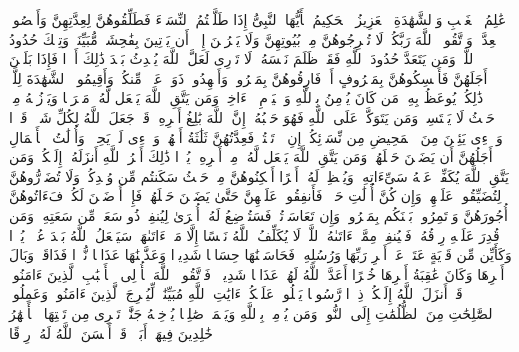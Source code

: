 \stopbuffer
\startbuffer[\q:64:18]
عَٰلِمُ ٱلۡغَیۡبِ وَٱلشَّهَٰدَةِ ٱلۡعَزِیزُ ٱلۡحَكِیمُ%
\stopbuffer
\startbuffer[\q:65:1]
یَٰۤأَیُّهَا ٱلنَّبِیُّ إِذَا طَلَّقۡتُمُ ٱلنِّسَاۤءَ فَطَلِّقُوهُنَّ لِعِدَّتِهِنَّ وَأَحۡصُوا۟ ٱلۡعِدَّةَۖ وَٱتَّقُوا۟ ٱللَّهَ رَبَّكُمۡۖ لَا تُخۡرِجُوهُنَّ مِنۢ بُیُوتِهِنَّ وَلَا یَخۡرُجۡنَ إِلَّاۤ أَن یَأۡتِینَ بِفَٰحِشَةࣲ مُّبَیِّنَةࣲۚ وَتِلۡكَ حُدُودُ ٱللَّهِۚ وَمَن یَتَعَدَّ حُدُودَ ٱللَّهِ فَقَدۡ ظَلَمَ نَفۡسَهُۥۚ لَا تَدۡرِی لَعَلَّ ٱللَّهَ یُحۡدِثُ بَعۡدَ ذَٰلِكَ أَمۡرࣰا%
\stopbuffer
\startbuffer[\q:65:2]
فَإِذَا بَلَغۡنَ أَجَلَهُنَّ فَأَمۡسِكُوهُنَّ بِمَعۡرُوفٍ أَوۡ فَارِقُوهُنَّ بِمَعۡرُوفࣲ وَأَشۡهِدُوا۟ ذَوَیۡ عَدۡلࣲ مِّنكُمۡ وَأَقِیمُوا۟ ٱلشَّهَٰدَةَ لِلَّهِۚ ذَٰلِكُمۡ یُوعَظُ بِهِۦ مَن كَانَ یُؤۡمِنُ بِٱللَّهِ وَٱلۡیَوۡمِ ٱلۡءَاخِرِۚ وَمَن یَتَّقِ ٱللَّهَ یَجۡعَل لَّهُۥ مَخۡرَجࣰا%
\stopbuffer
\startbuffer[\q:65:3]
وَیَرۡزُقۡهُ مِنۡ حَیۡثُ لَا یَحۡتَسِبُۚ وَمَن یَتَوَكَّلۡ عَلَى ٱللَّهِ فَهُوَ حَسۡبُهُۥۤۚ إِنَّ ٱللَّهَ بَٰلِغُ أَمۡرِهِۦۚ قَدۡ جَعَلَ ٱللَّهُ لِكُلِّ شَیۡءࣲ قَدۡرࣰا%
\stopbuffer
\startbuffer[\q:65:4]
وَٱلَّٰۤءِی یَئِسۡنَ مِنَ ٱلۡمَحِیضِ مِن نِّسَاۤئِكُمۡ إِنِ ٱرۡتَبۡتُمۡ فَعِدَّتُهُنَّ ثَلَٰثَةُ أَشۡهُرࣲ وَٱلَّٰۤءِی لَمۡ یَحِضۡنَۚ وَأُو۟لَٰتُ ٱلۡأَحۡمَالِ أَجَلُهُنَّ أَن یَضَعۡنَ حَمۡلَهُنَّۚ وَمَن یَتَّقِ ٱللَّهَ یَجۡعَل لَّهُۥ مِنۡ أَمۡرِهِۦ یُسۡرࣰا%
\stopbuffer
\startbuffer[\q:65:5]
ذَٰلِكَ أَمۡرُ ٱللَّهِ أَنزَلَهُۥۤ إِلَیۡكُمۡۚ وَمَن یَتَّقِ ٱللَّهَ یُكَفِّرۡ عَنۡهُ سَیِّءَاتِهِۦ وَیُعۡظِمۡ لَهُۥۤ أَجۡرًا%
\stopbuffer
\startbuffer[\q:65:6]
أَسۡكِنُوهُنَّ مِنۡ حَیۡثُ سَكَنتُم مِّن وُجۡدِكُمۡ وَلَا تُضَاۤرُّوهُنَّ لِتُضَیِّقُوا۟ عَلَیۡهِنَّۚ وَإِن كُنَّ أُو۟لَٰتِ حَمۡلࣲ فَأَنفِقُوا۟ عَلَیۡهِنَّ حَتَّىٰ یَضَعۡنَ حَمۡلَهُنَّۚ فَإِنۡ أَرۡضَعۡنَ لَكُمۡ فَءَاتُوهُنَّ أُجُورَهُنَّ وَأۡتَمِرُوا۟ بَیۡنَكُم بِمَعۡرُوفࣲۖ وَإِن تَعَاسَرۡتُمۡ فَسَتُرۡضِعُ لَهُۥۤ أُخۡرَىٰ%
\stopbuffer
\startbuffer[\q:65:7]
لِیُنفِقۡ ذُو سَعَةࣲ مِّن سَعَتِهِۦۖ وَمَن قُدِرَ عَلَیۡهِ رِزۡقُهُۥ فَلۡیُنفِقۡ مِمَّاۤ ءَاتَىٰهُ ٱللَّهُۚ لَا یُكَلِّفُ ٱللَّهُ نَفۡسًا إِلَّا مَاۤ ءَاتَىٰهَاۚ سَیَجۡعَلُ ٱللَّهُ بَعۡدَ عُسۡرࣲ یُسۡرࣰا%
\stopbuffer
\startbuffer[\q:65:8]
وَكَأَیِّن مِّن قَرۡیَةٍ عَتَتۡ عَنۡ أَمۡرِ رَبِّهَا وَرُسُلِهِۦ فَحَاسَبۡنَٰهَا حِسَابࣰا شَدِیدࣰا وَعَذَّبۡنَٰهَا عَذَابࣰا نُّكۡرࣰا%
\stopbuffer
\startbuffer[\q:65:9]
فَذَاقَتۡ وَبَالَ أَمۡرِهَا وَكَانَ عَٰقِبَةُ أَمۡرِهَا خُسۡرًا%
\stopbuffer
\startbuffer[\q:65:10]
أَعَدَّ ٱللَّهُ لَهُمۡ عَذَابࣰا شَدِیدࣰاۖ فَٱتَّقُوا۟ ٱللَّهَ یَٰۤأُو۟لِی ٱلۡأَلۡبَٰبِ ٱلَّذِینَ ءَامَنُوا۟ۚ قَدۡ أَنزَلَ ٱللَّهُ إِلَیۡكُمۡ ذِكۡرࣰا%
\stopbuffer
\startbuffer[\q:65:11]
رَّسُولࣰا یَتۡلُوا۟ عَلَیۡكُمۡ ءَایَٰتِ ٱللَّهِ مُبَیِّنَٰتࣲ لِّیُخۡرِجَ ٱلَّذِینَ ءَامَنُوا۟ وَعَمِلُوا۟ ٱلصَّٰلِحَٰتِ مِنَ ٱلظُّلُمَٰتِ إِلَى ٱلنُّورِۚ وَمَن یُؤۡمِنۢ بِٱللَّهِ وَیَعۡمَلۡ صَٰلِحࣰا یُدۡخِلۡهُ جَنَّٰتࣲ تَجۡرِی مِن تَحۡتِهَا ٱلۡأَنۡهَٰرُ خَٰلِدِینَ فِیهَاۤ أَبَدࣰاۖ قَدۡ أَحۡسَنَ ٱللَّهُ لَهُۥ رِزۡقًا%
